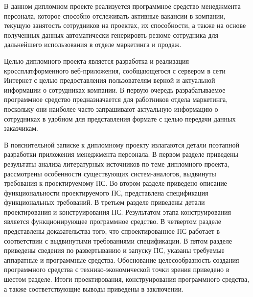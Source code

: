 В данном дипломном проекте реализуется программное средство менеджмента персонала, которое способно отслеживать
активные вакансии в компании, текущую занятость сотрудников на проектах, их способности, а также на основе полученных
данных автоматически генерировть резюме сотрудника для дальнейшего использования в отделе маркетинга и продаж.

Целью дипломного проекта является разработка и реализация кроссплатформенного веб-приложения, сообщающегося с сервером
в сети Интернет с целью предоставления пользователям верной и актуальной информации о сотрудниках компании. В первую
очередь разрабатываемое программное средство предназначается для работников отдела маркетинга, поскольку они наиболее
часто запрашивают актуальную информацию о сотрудниках в удобном для представления формате с целью передачи данных заказчикам.

В пояснительной записке к дипломному проекту излагаются детали поэтапной разработки приложения менеджмента персонала.
В первом разделе приведены результаты анализа литературных источников по теме дипломного проекта, рассмотрены
особенности существующих систем-аналогов, выдвинуты требования к проектируемому ПС. Во втором разделе приведено
описание функциональности проектируемого ПС, представлена спецификация функциональных требований. В третьем
разделе приведены детали проектирования и конструирования ПС. Результатом этапа конструирования является функционирующее
программное средство. В четвертом разделе представлены доказательства того, что спроектированное ПС работает в
соответствии с выдвинутыми требованиями спецификации. В пятом разделе приведены сведения по развертыванию и запуску ПС,
указаны требуемые аппаратные и программные средства. Обоснование целесообразность создания программного средства с
технико-экономической точки зрения приведено в шестом разделе. Итоги проектирования, конструирования программного
средства, а также соответствующие выводы приведены в заключении.
